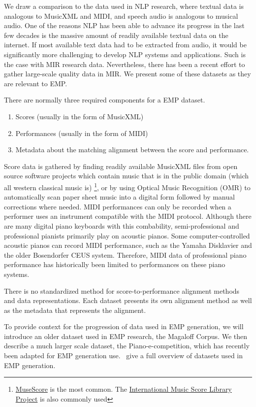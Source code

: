 We draw a comparison to the data used in NLP research, where textual data is analogous to MusicXML and MIDI, and speech audio is analogous to musical audio. One of the reasons NLP has been able to advance its progress in the last few decades is the massive amount of readily available textual data on the internet. If most available text data had to be extracted from audio, it would be significantly more challenging to develop NLP systems and applications. Such is the case with MIR research data. Nevertheless, there has been a recent effort to gather large-scale quality data in MIR. We present some of these datasets as they are relevant to EMP. 

There are normally three required components for a EMP dataset. 
\begin{enumerate}
    \item Scores (usually in the form of MusicXML)
    \item Performances (usually in the form of MIDI)
    \item Metadata about the matching alignment between the score and performance. 
\end{enumerate}
Score data is gathered by finding readily available MusicXML files from open source software projects which contain music that is in the public domain (which all western classical music is) \footnote{\href{https://musescore.com}{MuseScore} is the most common. The \href{https://imslp.org/wiki/Main_Page}{International Music Score Library Project} is also commonly used}, or by using Optical Music Recognition (OMR) to automatically scan paper sheet music into a digital form followed by manual corrections where needed. MIDI performances can only be recorded when a performer uses an instrument compatible with the MIDI protocol. Although there are many digital piano keyboards with this combability, semi-professional and professional pianists primarily play on acoustic pianos. Some computer-controlled acoustic pianos can record MIDI performance, such as the Yamaha Disklavier and the older Bosendorfer CEUS system. Therefore, MIDI data of professional piano performance has historically been limited to performances on these piano systems. 

There is no standardized method for score-to-performance alignment methods and data representations. Each dataset presents its own alignment method as well as the metadata that represents the alignment. 

To provide context for the progression of data used in EMP generation, we will introduce an older dataset used in EMP research, the Magaloff Corpus. We then describe a much larger scale dataset, the Piano-e-competition, which has recently been adapted for EMP generation use.~\citet{cancino2018computational} give a full overview of datasets used in EMP generation. 

